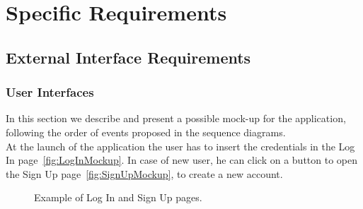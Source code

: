 \chapter{Specific Requirements}

\section{External Interface Requirements}

\subsection{User Interfaces}

In this section we describe and present a possible mock-up for the application, following the order of events proposed in the sequence diagrams.\\

At the launch of the application the user has to insert the credentials in the Log In page~\ref{fig:LogInMockup}. In case of new user, he can click on a button to open the Sign Up page~\ref{fig:SignUpMockup}, to create a new account.

\begin{figure}[H]
	\centering     %
	\caption{Example of Log In and Sign Up pages.}
\end{figure}

